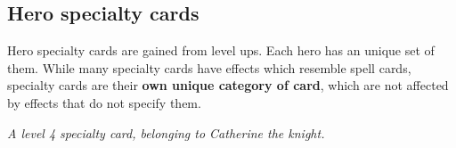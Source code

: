 \subsection*{\hypertarget{Specialty}{Hero specialty cards}}
Hero specialty cards are gained from level ups.
Each hero has an unique set of them.
While many specialty cards have effects which resemble spell cards, specialty cards are their \textbf{own unique category of card}, which are not affected by effects that do not specify them.
\par

\begin{figure}[h]
\centering
{}
\end{figure}
\begin{center}
\textit{A level 4 specialty card, belonging to Catherine the knight.}
\end{center}
